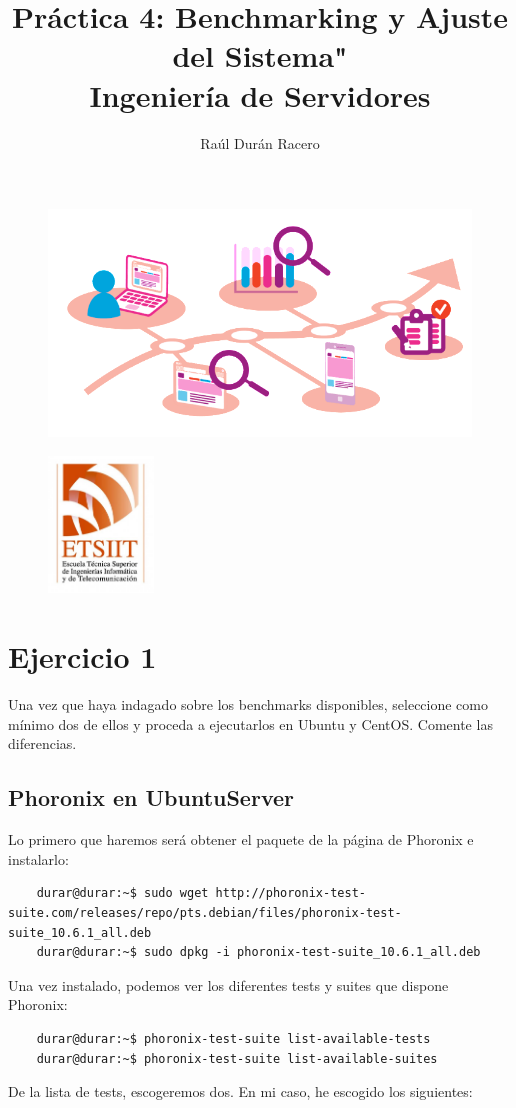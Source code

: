 \documentclass[a4paper]{article}
\begin{document}
\pagestyle{plain}
\title{Práctica 4: Benchmarking y Ajuste del Sistema" \\ 
Ingeniería de Servidores}
\author{Raúl Durán Racero}
\begin{figure}
    \raggedright
    \includegraphics[width=1.25\textwidth]{benchmarking004.png}
\end{figure}
\maketitle
\begin{figure}
    \centering
    \includegraphics[width=0.25\textwidth]{logoEtsiit.pdf}
\end{figure}

\newpage
\tableofcontents
\newpage
\section{Ejercicio 1}
Una vez que haya indagado sobre los benchmarks disponibles, seleccione 
como mínimo dos de ellos y proceda a ejecutarlos en Ubuntu y CentOS.
Comente las diferencias.
\subsection{Phoronix en UbuntuServer}
Lo primero que haremos será obtener el paquete de la página de Phoronix e instalarlo:
\begin{lstlisting}
    durar@durar:~$ sudo wget http://phoronix-test-suite.com/releases/repo/pts.debian/files/phoronix-test-suite_10.6.1_all.deb
    durar@durar:~$ sudo dpkg -i phoronix-test-suite_10.6.1_all.deb
\end{lstlisting}
Una vez instalado, podemos ver los diferentes tests y suites que dispone Phoronix:
\begin{lstlisting}
    durar@durar:~$ phoronix-test-suite list-available-tests
    durar@durar:~$ phoronix-test-suite list-available-suites
\end{lstlisting}
De la lista de tests, escogeremos dos. En mi caso, he escogido los siguientes:
\end{document}
